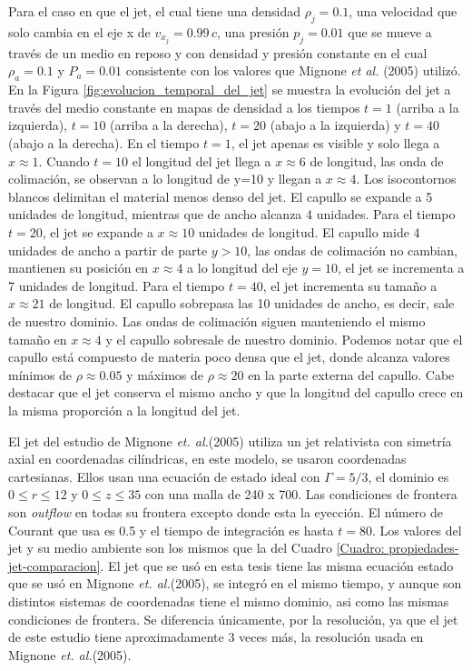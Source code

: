 \documentclass[12pt,a4paper]{book}
\begin{document}
Para el caso en que el jet, el cual tiene una densidad $\rho_j = 0.1$, una velocidad que
solo cambia en el eje x de $v_{x_{j}} = 0.99 \, c$, una presión $p_j = 0.01$ que se mueve a través de un 
{\color{red} medio en reposo y con densidad y presión constante} en el cual 
$\rho_a = 0.1 $ y $P_a = 0.01$  consistente con los valores que Mignone \emph{et al.} (2005) utilizó. 
En la Figura \ref{fig:evolucion_temporal_del_jet} se muestra la evolución del jet a 
través del medio constante en mapas de densidad
a los tiempos $t = 1$ (arriba a la izquierda), $t = 10$ (arriba a la derecha), 
$t = 20$ (abajo a la izquierda) y $t = 40$ (abajo a la derecha).
En el tiempo $t = 1$, el jet apenas es visible y solo llega a $x \approx 1$. 
Cuando $t = 10$ el longitud del jet llega  a $x \approx 6$ de longitud, las onda de colimación, se observan a 
lo longitud de y=10 y llegan a $x \approx 4$. Los  isocontornos blancos delimitan el material menos denso del jet. 
El capullo se expande a 5 unidades de longitud, mientras que de ancho alcanza 4 unidades.
Para el tiempo $t = 20$, el jet se expande a 
$x \approx 10$ unidades de longitud. El capullo mide 4 unidades de ancho a partir de parte $y > 10$, 
las ondas de colimación no cambian, mantienen su posición en $x \approx 4$ a lo longitud del eje $y = 10$, el jet se incrementa
a 7 unidades de longitud. Para el tiempo $t = 40$, el jet incrementa su tamaño a $x \approx 21$ de longitud. 
El capullo sobrepasa las 10 unidades de ancho, es decir, sale de nuestro dominio. Las ondas de colimación siguen manteniendo el mismo 
tamaño en $x \approx 4$ y el capullo sobresale de nuestro dominio. Podemos notar que el capullo está compuesto 
de materia poco densa que el jet, donde alcanza valores mínimos de $\rho \approx 0.05 $ y 
máximos de $\rho  \approx 20$ en la
parte externa del capullo. Cabe destacar que el jet conserva el mismo ancho y que la longitud del capullo crece 
en la misma proporción a la longitud del jet.

El jet del estudio de  Mignone \emph{et. al.}(2005) utiliza un jet relativista con simetría axial en 
coordenadas cilíndricas,  en este modelo, se usaron coordenadas cartesianas. 
Ellos usan una ecuación de estado ideal con $\Gamma = 5/3$, el dominio es 
$0 \leqslant r \leqslant 12$ y $0 \leqslant z \leqslant 35$ con una malla de 240 x 700. Las condiciones de
frontera son \emph{outflow} en todas su frontera excepto donde esta la eyección. El número de Courant que
usa es 0.5 y el tiempo de integración es hasta $t = 80$. Los valores del jet y su medio ambiente son los
mismos que la del Cuadro \ref{Cuadro: propiedades-jet-comparacion}. El jet que se usó en esta tesis tiene las 
misma ecuación estado que se usó en Mignone \emph{et. al.}(2005), se integró en el mismo tiempo, y aunque son distintos 
sistemas de coordenadas tiene el mismo dominio, asi como las mismas condiciones de frontera. Se diferencia únicamente,
por la resolución, ya que el jet de este estudio tiene aproximadamente 3 veces más, la resolución usada en Mignone 
\emph{et. al.}(2005).
\end{document}

